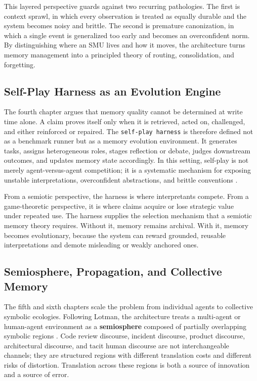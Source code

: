 \documentclass[11pt]{article}
\begin{document}
This layered perspective guards against two recurring pathologies. The first is context sprawl, in which every observation is treated as equally durable and the system becomes noisy and brittle. The second is premature canonization, in which a single event is generalized too early and becomes an overconfident norm. By distinguishing where an SMU lives and how it moves, the architecture turns memory management into a principled theory of routing, consolidation, and forgetting.

\subsection{Self-Play Harness as an Evolution Engine}

The fourth chapter argues that memory quality cannot be determined at write time alone. A claim proves itself only when it is retrieved, acted on, challenged, and either reinforced or repaired. The \texttt{self-play harness} is therefore defined not as a benchmark runner but as a memory evolution environment. It generates tasks, assigns heterogeneous roles, stages reflection or debate, judges downstream outcomes, and updates memory state accordingly. In this setting, self-play is not merely agent-versus-agent competition; it is a systematic mechanism for exposing unstable interpretations, overconfident abstractions, and brittle conventions \cite{shinn2023reflexion, li2023camel, madaan2023selfrefine, yao2023react}.

From a semiotic perspective, the harness is where interpretants compete. From a game-theoretic perspective, it is where claims acquire or lose strategic value under repeated use. The harness supplies the selection mechanism that a semiotic memory theory requires. Without it, memory remains archival. With it, memory becomes evolutionary, because the system can reward grounded, reusable interpretations and demote misleading or weakly anchored ones.

\subsection{Semiosphere, Propagation, and Collective Memory}

The fifth and sixth chapters scale the problem from individual agents to collective symbolic ecologies. Following Lotman, the architecture treats a multi-agent or human-agent environment as a \textbf{semiosphere} composed of partially overlapping symbolic regions \cite{lotman2005semiosphere, noth2015topography}. Code review discourse, incident discourse, product discourse, architectural discourse, and tacit human discourse are not interchangeable channels; they are structured regions with different translation costs and different risks of distortion. Translation across these regions is both a source of innovation and a source of error.
\end{document}
